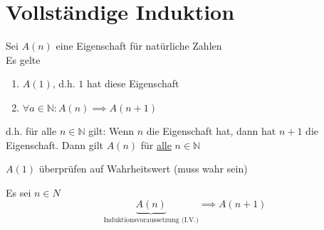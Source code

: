 \documentclass[a4paper, parskip = true, fleqn, headsepline = true]{scrartcl}
\newcommand{\N}{\mathbb{N}}
\begin{document}
\section{Vollständige Induktion}

\begin{theorem}
	\label{theo:Induktion}
	Sei $ A(n) $ eine Eigenschaft für natürliche Zahlen\\
	Es gelte
	\begin{enumerate}[label=(\roman*)]
		\item $ A(1) $, d.h. $ 1 $ hat diese Eigenschaft
		\item $ \forall a \in \N : A(n) \implies A(n+1) $
	\end{enumerate}
	d.h. für alle $ n \in \N $ gilt: Wenn $ n $ die Eigenschaft hat, dann hat $ n + 1 $ die Eigenschaft.
	Dann gilt $ A(n) $ für \underline{alle} $ n \in \N $
	\begin{blackbox}[Induktionsanfang (I.A.)]
		$ A(1) $ überprüfen auf Wahrheitswert (muss wahr sein)
	\end{blackbox}
	\begin{blackbox}[Induktionsschritt (I.S.)]
		Es sei $ n \in N $
		\[ \underbrace{A(n)}_{\text{Induktionsvoraussetzung (I.V.)}} \implies A(n+1) \]
	\end{blackbox}
\end{theorem}
\end{document}
